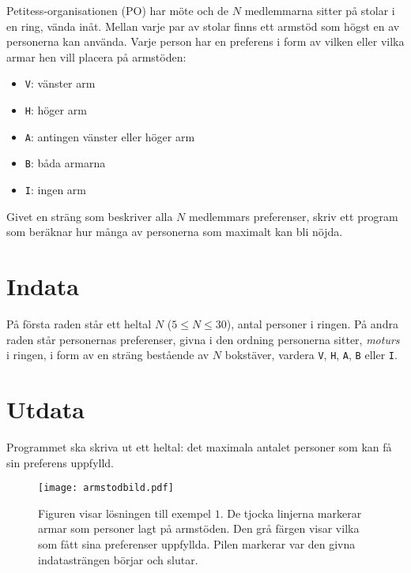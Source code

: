 
Petitess-organisationen (PO) har möte och de $N$ medlemmarna sitter på
stolar i en ring, vända inåt. Mellan varje par av stolar finns ett armstöd som högst en av personerna kan använda. Varje person har en preferens i form av vilken eller vilka armar hen vill placera på armstöden:
\begin{itemize}
\item \texttt{V}: vänster arm
\item \texttt{H}: höger arm
\item \texttt{A}: antingen vänster eller höger arm
\item \texttt{B}: båda armarna
\item \texttt{I}: ingen arm
\end{itemize}

Givet en sträng som beskriver alla $N$ medlemmars preferenser, skriv ett program som beräknar hur många av personerna som maximalt kan bli nöjda.

\section*{Indata}
På första raden står ett heltal $N$ ($5\le N \le 30$), antal personer i ringen. På andra raden står personernas preferenser, givna i den ordning
personerna sitter, {\em moturs} i ringen, i form av en
sträng bestående av $N$ bokstäver, vardera \texttt{V}, \texttt{H},
\texttt{A}, \texttt{B} eller \texttt{I}. 

\section*{Utdata}
Programmet ska skriva ut ett heltal: det maximala antalet personer som kan få sin preferens uppfylld.

\begin{figure}[!htb]
\begin{center}
\texttt{[image: armstodbild.pdf]}
\end{center}
\caption{Figuren visar lösningen till exempel $1$. De tjocka linjerna markerar
armar som personer lagt på armstöden. Den grå färgen visar vilka som fått sina preferenser uppfyllda. Pilen markerar var den givna
indatasträngen börjar och slutar.}
\end{figure}

